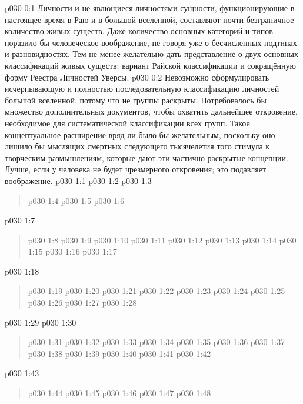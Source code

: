 \author{Могущественный Посланник}
\vs p030 0:1 Личности и не явлющиеся личностями сущности, функционирующие в настоящее время в Раю и в большой вселенной, составляют почти безграничное количество живых существ. Даже количество основных категорий и типов поразило бы человеческое воображение, не говоря уже о бесчисленных подтипах и разновидностях. Тем не менее желательно дать представление о двух основных классификаций живых существ: вариант Райской классификации и сокращённую форму Реестра Личностей Уверсы.
\vs p030 0:2 Невозможно сформулировать исчерпывающую и полностью последовательную классификацию личностей большой вселенной, потому что не  группы раскрыты. Потребовалось бы множество дополнительных документов, чтобы охватить дальнейшее откровение, необходимое для систематической классификации всех групп. Такое концептуальное расширение вряд ли было бы желательным, поскольку оно лишило бы мыслящих смертных следующего тысячелетия того стимула к творческим размышлениям, которые дают эти частично раскрытые концепции. Лучше, если у человека не будет чрезмерного откровения; это подавляет воображение.
\vs p030 1:1 
\vsetspace
\vs p030 1:2 
\vsetspace
\vs p030 1:3 
\begin{quote}
\vs p030 1:4 
\vs p030 1:5 
\vs p030 1:6 
\end{quote}
\vsetspace
\vs p030 1:7 
\begin{quote}
\vs p030 1:8 
\vs p030 1:9 
\vs p030 1:10 
\vs p030 1:11 
\vs p030 1:12 
\vs p030 1:13 
\vs p030 1:14 
\vs p030 1:15 
\vs p030 1:16 
\vs p030 1:17 
\end{quote}
\vsetspace
\vs p030 1:18 
\begin{quote}
\vs p030 1:19 
\vs p030 1:20 
\vs p030 1:21 
\vs p030 1:22 
\vs p030 1:23 
\vs p030 1:24 
\vs p030 1:25 
\vs p030 1:26 
\vs p030 1:27 
\vs p030 1:28 
\end{quote}
\vsetspace
\vs p030 1:29 
\vsetspace
\vs p030 1:30 
\begin{quote}
\vs p030 1:31 
\vs p030 1:32 
\vs p030 1:33 
\vs p030 1:34 
\vs p030 1:35 
\vs p030 1:36 
\vs p030 1:37 
\vs p030 1:38 
\vs p030 1:39 
\vs p030 1:40 
\vs p030 1:41 
\vs p030 1:42 
\end{quote}
\vsetspace
\vs p030 1:43 
\begin{quote}
\vs p030 1:44 
\vs p030 1:45 
\vs p030 1:46 
\vs p030 1:47 
\vs p030 1:48 
\end{quote}
